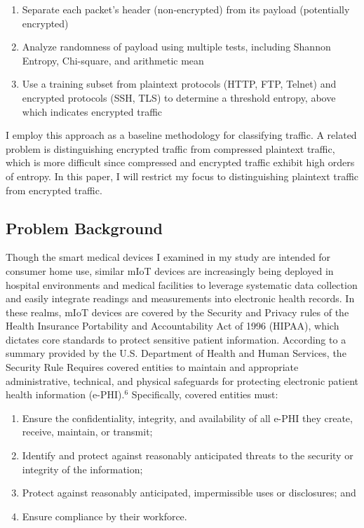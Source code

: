 \begin{enumerate}
  \item Separate each packet's header (non-encrypted) from its payload (potentially encrypted)
  \item Analyze randomness of payload using multiple tests, including Shannon Entropy, Chi-square, and arithmetic mean
  \item Use a training subset from plaintext protocols (HTTP, FTP, Telnet) and encrypted protocols (SSH, TLS) to determine a threshold entropy, above which indicates encrypted traffic
\end{enumerate}

I employ this approach as a baseline methodology for classifying traffic. A related problem is distinguishing encrypted traffic from compressed plaintext traffic, which is more difficult since compressed and encrypted traffic exhibit high orders of entropy. In this paper, I will restrict my focus to distinguishing plaintext traffic from encrypted traffic.  

\subsection{Problem Background}

Though the smart medical devices I examined in my study are intended for consumer home use, similar mIoT devices are increasingly being deployed in hospital environments and medical facilities to leverage systematic data collection and easily integrate readings and measurements into electronic health records. In these realms, mIoT devices are covered by the Security and Privacy rules of the Health Insurance Portability and Accountability Act of 1996 (HIPAA), which dictates core standards to protect sensitive patient information. According to a summary provided by the U.S. Department of Health and Human Services, the Security Rule Requires covered entities to maintain and appropriate administrative, technical, and physical safeguards for protecting electronic patient health information (e-PHI).$^6$ Specifically, covered entities must:

\begin{enumerate}
  \item Ensure the confidentiality, integrity, and availability of all e-PHI they create, receive, maintain, or transmit;
  \item Identify and protect against reasonably anticipated threats to the security or integrity of the information;
  \item Protect against reasonably anticipated, impermissible uses or disclosures; and
  \item Ensure compliance by their workforce. 
\end{enumerate}

